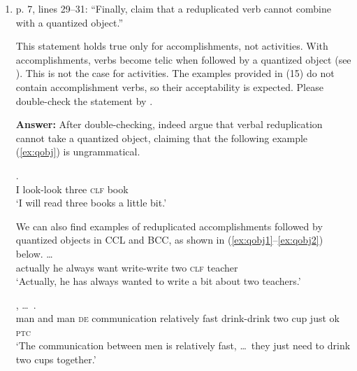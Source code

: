 \documentclass[fleqn,twoside]{article}
\begin{document}
\begin{enumerate}
\z\z

\item p. 7, lines 29--31: ``Finally, \citet[322]{SuiHu2016} claim that a reduplicated verb cannot combine with
a quantized object.''

This statement holds true only for accomplishments, not activities. With accomplishments, verbs
become telic when followed by a quantized object (see \citealt{Verkuyl1972}). This is not the case for
activities. The examples provided in (15) do not contain accomplishment verbs, so their acceptability
is expected. Please double-check the statement by  \citet[322]{SuiHu2016}.

\noindent
\textbf{Answer:} After double-checking,
 \citet[322]{SuiHu2016} indeed argue that verbal reduplication cannot take a quantized object, 
 claiming that the following example (\ref{ex:qobj}) is ungrammatical.

\ea\label{ex:qobj}
\gll {}    .\\
I look-look three \textsc{clf} book\\  
\glt `I will read three books a little bit.'
\z

We can also find examples of reduplicated accomplishments followed by quantized objects in CCL and BCC, as shown in (\ref{ex:qobj1}--\ref{ex:qobj2}) below.
\ea\label{ex:qobj1}
\gll {}        \ldots\\
actually he always want write-write two \textsc{clf} teacher\\ 
\glt `Actually, he has always wanted to write a bit about two teachers.'

\ex\label{ex:qobj2}%
\gll {}      , \ldots\,      .\\
man and man \textsc{de} communication relatively fast {} drink-drink two cup just ok \textsc{ptc}\\ 
\glt `The communication between men is relatively fast, \ldots\, they just need to drink two cups together.'


\end{enumerate}
\end{document}
